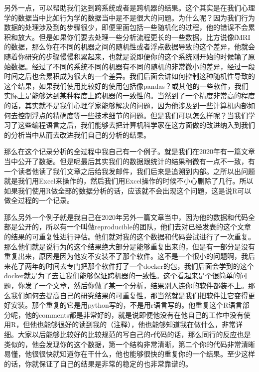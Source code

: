 \documentclass[
  oneside]{book}
\begin{document}
另外一点，可以帮助我们达到跨系统或者是跨机器的结果。这个其实是在我们心理学的数据当中比如行为学的数据当中是不是很大的问题。为什么呢？因为我们行为数据的处理涉及到的步骤很少，即便里面包括一些随机化的过程，他的错误不会累积和放大。但是如果你们要去处理一些分析流程更长的一些数据，比方说像fMRI的数据，那么你在不同的机器之间的随机性或者浮点数据导致的这个差异，他就会随着你研究的步骤慢慢积累起来，也就是说即便你的这个系统刚开始的时候输了原始数据。经过了不同的系统不同的机器有不同的随机的非常微小的差异，经过一段时间之后也会累积成为很大的一个差异。我们后面会讲如何控制这种随机性导致的这个结果，如果我们使用比较好的使用包括像pandas？或其他的一些软件，我们实际上是能够达到某种程度上跨机器的一致性的。当然到了一个精度非常高的程度的话，其实就不是我们心理学家能够解决的问题，因为他涉及到一些计算机内部如何去控制浮点的精确度等一些技术细节的问题。但是我们可以怎么样呢？当我们学习了这些编程语言之后，我们能够去把计算机科学家在这方面做的改进纳入到我们的分析当中从而去改进我们自己的分析的结果。

那么在这个记录分析的全过程中我自己有一个例子。就是我们在2020年有一篇文章当中公开了数据。但是呢最后其实我们的数据跟统计的结果稍微有一点不一致，有一个读者他读了我们文章之后给我发邮件，我们后来是追溯到内部。之所以出问题就是我们用Excel来操作的，然后我们用Excel操作的时候不小心删除了几行。所以如果我们使用R做全部的数据分析的话，应该就不会出现这个问题，这是说R可以做全过程的一个记录。

那么另外一个例子就是我自己在2020年另外一篇文章当中，因为他的数据和代码全部是公开的，所以有一个叫做reproducible的团队，他们去对已经发表的这个文章的结果的可重复性进行评估。他们就对我的这个数据和代码尝试进行了一次重复。那么他们就是说行为的这个结果绝大部分是能够重复出来的，但是有一部分是没有重复出来，原因是因为他安不安装不了那个软件。这不是一个很小的问题啊，我后来花了两年的时间去专门把那个软件打了一个docker的包，我们后面会学到的这个docker就是为了去让我们能够保证跨机器的一致性。这个看起来是个很简单的问题，你发了一个文章，然后你做了某一个分析，结果别人连你的软件都装不上。那么我们如何去提高自己的研究结果的可重复性，那当然就是我们把软件让它变得更好安装。那个重复的它是用python写的，不是用r语言写的。他重复这个R语言部分呢，他的comments都是非常好的，就是说即便他没有在他自己的工作中没有使用R，但他也能够很好的读到我的（注释），他也能够知道我在做什么，非常详细。大家以后能够比较好的比较规范的写自己的r代码的话，那么同行的反应也是类似的，他会发现你的这个数据，第一个结构非常清晰，第二个你的代码非常清晰易懂，他很很快就知道你在干什么，他也能够很快的重复你的一个结果。至少这样的话，你就保证了自己的结果是非常的稳定的也非常靠谱的。
\end{document}
